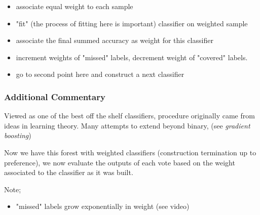 \documentclass{article}
\begin{document}
\begin{itemize}
	\item associate equal weight to each sample
	\item "fit" (the process of fitting here is important) classifier on weighted sample
	\item associate the final summed accuracy as weight for this classifier
	\item increment weights of "missed" labels, decrement weight of "covered" labels.
	\item go to second point here and construct a next classifier
\end{itemize}

\subsubsection*{Additional Commentary}
Viewed as one of the best off the shelf classifiers, procedure originally came from ideas in learning theory. Many attempts to extend beyond binary, (see {\em gradient boosting})

Now we have this forest with weighted classifiers (construction termination up to preference), we now evaluate the outputs of each vote based on the weight associated to the classifier as it was built.

Note; 
\begin{itemize}
	\item "missed" labels grow exponentially in weight (see video)
\end{itemize}
\end{document}
